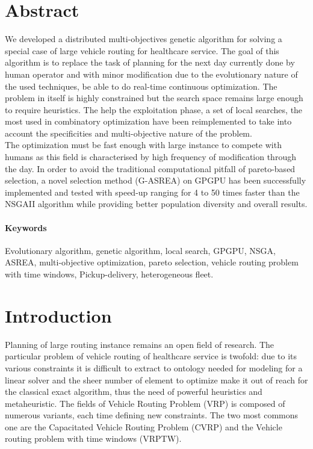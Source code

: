 \documentclass[12pt]{memoir}
\begin{document}
\section{Abstract}
We developed a distributed multi-objectives genetic algorithm for solving a special case of
large vehicle routing for healthcare service. The goal of this algorithm is to
replace the task of planning for the next day currently done by human operator and with
minor modification due to the evolutionary nature of the used techniques, be able to
do real-time continuous optimization. The problem in itself is highly constrained
but the search space remains large enough to require heuristics. The help the
exploitation phase, a set of local searches, the most used in combinatory
optimization have been reimplemented to take into account the specificities and
multi-objective nature of the problem. \\
The optimization must be fast enough with large instance to compete with humans as
this field is characterised by high frequency of modification through the day. In
order to avoid the traditional computational pitfall of pareto-based selection, a
novel selection method (G-ASREA) on GPGPU has been successfully implemented and tested with
speed-up ranging for 4 to 50 times faster than the NSGAII algorithm while providing
better population diversity and overall results.
\paragraph{Keywords}
Evolutionary algorithm, genetic algorithm, local search, GPGPU, NSGA, ASREA, multi-objective optimization, pareto selection, vehicle routing problem with time windows, Pickup-delivery, heterogeneous fleet.
\newpage
\section{Introduction}
Planning of large routing instance remains an open field of research. The particular
problem of vehicle routing of healthcare service is twofold: due to its
various constraints it is difficult to extract to ontology needed for modeling for
a linear solver and the sheer number of element to optimize make it out of reach for
the classical exact algorithm, thus the need of powerful heuristics and 
metaheuristic. The fields of Vehicle Routing Problem (VRP) is composed of numerous variants, each time defining new constraints. The two most commons one are the Capacitated Vehicle Routing Problem (CVRP) and the Vehicle routing problem with time windows (VRPTW).
\end{document}
